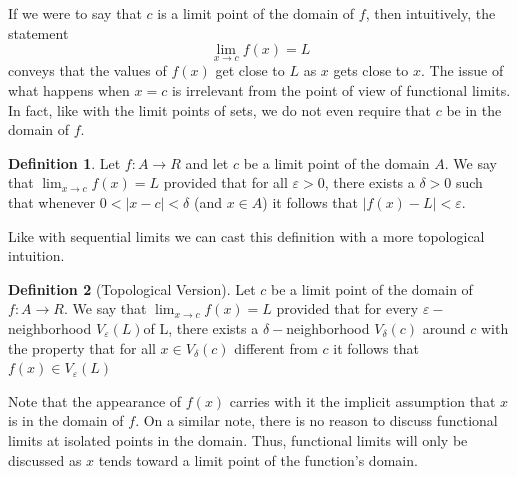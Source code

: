 \documentclass{tufte-book}
\theoremstyle{definition}
\newtheorem{definition}{Definition}[chapter]
\numberwithin{section}{chapter}
\begin{document}
If we were to say that $c$ is a limit point of the domain of $f$, then intuitively, the statement 
\[		\lim_{x \to c} f(x) = L\]
conveys that the values of $f(x)$ get close to $L$ as $x$ gets close to $x$.   The issue of what happens when $x=c$ is irrelevant from the point of view of functional limits.  In fact, like with the limit points of sets, we do not even require that $c$ be in the domain of $f$.

\begin{definition}
	Let $f: A \to R$ and let $c$ be a limit point of the domain $A$.  We say that $\lim_{x \to c} f(x) = L$ provided that for all $\varepsilon >0$, there exists a $\delta >0$ such that whenever $0 < |x - c| < \delta$ (and $x\in A$) it follows that $|f(x) - L|<\varepsilon$.  
\end{definition}

Like with sequential limits we can cast this definition with a more topological intuition.

\begin{definition}[Topological Version]
	Let $c$ be a limit point of the domain of $f: A \to R$.  We say that $\lim_{x \to c} f(x) = L$ provided that for every $\varepsilon-$neighborhood $V_{\varepsilon}(L)$of L, there exists a $\delta-$neighborhood $V_{\delta}(c)$ around $c$ with the property that for all $x \in V_{\delta}(c)$ different from $c$ it follows that $f(x) \in V_{\varepsilon}(L)$\end{definition}


Note that the appearance of $f(x)$ carries with it the implicit assumption that $x$ is in the domain of $f$.  On a similar note, there is no reason to discuss functional limits at isolated points in the domain.  Thus, functional limits will only be discussed as $x$ tends toward a limit point of the function's domain.






\backmatter





\printindex
\end{document}
